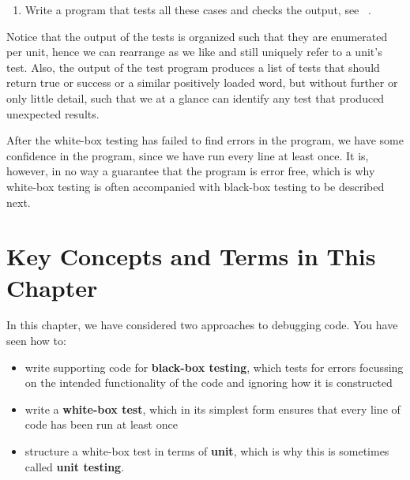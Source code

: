 \documentclass[fsharpNotes.tex]{subfiles}
\begin{document}
\begin{enumerate}
\begin{table}
\begin{center}
\begin{tabularx}{\linewidth}{|l|l|p{3.5cm}|l|X|}
         \hline
       \end{tabularx}
     \end{center}
     \caption{Unit test}
     \label{tab:unitTest}
   \end{table}
   The impossible cases have been intentionally blank, e.g., it is not possible for $j<0$ and $j>n$ for some positive value $n$.
 \item Write a program that tests all these cases and checks the output, see ~.
\end{enumerate}
Notice that the output of the tests is organized such that they are enumerated per unit, hence we can rearrange as we like and still uniquely refer to a unit's test. Also, the output of the test program produces a list of tests that should return true or success or a similar positively loaded word, but without further or only little detail, such that we at a glance can identify any test that produced unexpected results.

After the white-box testing has failed to find errors in the program, we have some confidence in the program, since we have run every line at least once. It is, however, in no way a guarantee that the program is error free, which is why white-box testing is often accompanied with black-box testing to be described next.

\section{Key Concepts and Terms in This Chapter}
In this chapter, we have considered two approaches to debugging code. You have seen how to:
\begin{itemize}
\item write supporting code for \textbf{black-box testing}, which tests for errors focussing on the intended functionality of the code and ignoring how it is constructed
\item write a \textbf{white-box test}, which in its simplest form ensures that every line of code has been run at least once
\item structure a white-box test in terms of \textbf{unit}, which is why this is sometimes called \textbf{unit testing}.
\end{itemize}
\end{document}
